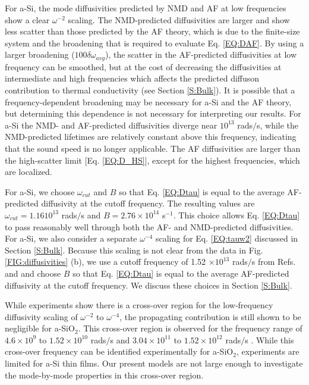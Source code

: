 \documentclass[aps,prb,twocolumn,superscriptaddress,footinbib,amsmath,amssymb,floatfix]{revtex4}
\begin{document}
For a-Si, the mode diffusivities predicted by NMD and AF at 
low frequencies show a clear $\omega^{-2}$ scaling. 
The NMD-predicted diffusivities are larger and show less 
scatter than those predicted by the AF theory, which is due to 
the finite-size system and the broadening that is 
required to evaluate 
Eq. \eqref{EQ:DAF}.\cite{feldman_thermal_1993} By using a larger 
broadening ($100\delta\omega_{avg}$), the scatter 
in the AF-predicted 
diffusivities at low frequency can be smoothed, but at the cost of 
decreasing the diffusivities at intermediate and 
high frequencies which 
affects the predicted diffuson contribution to thermal conductivity 
(see Section \ref{S:Bulk}). 
It is possible that a frequency-dependent broadening may be necessary 
for a-Si and the AF theory,  
but determining this dependence is not necessary for 
interpreting our results. 
For a-Si the NMD- and AF-predicted diffusivities diverge 
near $10^{13}$ rads$/$s, while the NMD-predicted lifetimes 
are relatively constant above this frequency, 
indicating that the sound speed is no longer 
applicable. The AF diffusivities are 
larger than the high-scatter limit [Eq. \eqref{EQ:D_HS}], 
except for the 
highest frequencies, which are localized.\cite{feldman_thermal_1993} 

For a-Si, we choose $\omega_{cut}$  
and $B$ so that Eq. \eqref{EQ:Dtau} is equal 
to the average AF-predicted diffusivity at the cutoff frequency. 
The resulting values are $\omega_{cut}=1.16 10^{13}$ rads$/$s 
and $B=2.76\times10^{14}$ s$^{-1}$. This choice 
allows Eq. \eqref{EQ:Dtau} to pass reasonably well through both 
the AF- and NMD-predicted diffusivities. For a-Si, we also 
consider a separate $\omega^{-4}$ scaling 
for Eq. \eqref{EQ:tauw2} discussed in Section \ref{S:Bulk}. 
Because this scaling is not clear from the data in 
Fig. \ref{FIG:diffusivities} (b),  
we use a cutoff frequency of 1.52 $\times 10^{13}$ rads$/$s  
from Refs.  and 
and choose $B$ so that Eq. \eqref{EQ:Dtau} is equal to the average 
AF-predicted diffusivity at the cutoff frequency. 
We discuss these choices in Section \ref{S:Bulk}. 

While experiments show there is a cross-over region for the 
low-frequency diffusivity scaling of $\omega^{-2}$ to 
$\omega^{-4}$,
\cite{masciovecchio_evidence_2006,baldi_emergence_2013} 
the propagating contribution is still shown to be negligible 
for a-SiO$_2$.
\cite{love_estimate_1990,baldi_thermal_2008}
This cross-over region is observed for the frequency range of 
$4.6\times10^9$ to 
$1.52\times10^{10}$ rads$/$s\cite{masciovecchio_evidence_2006} 
and $3.04\times10^11$ to $1.52\times10^{12}$ rads$/$s
\cite{baldi_emergence_2013}. While this cross-over frequency 
can be identified 
experimentally for a-SiO$_2$,\cite{masciovecchio_evidence_2006} 
experiments are limited for a-Si thin films.
\cite{hondongwa_ultrasonic_2011} 
Our present models are not 
large enough to investigate the mode-by-mode properties 
in this cross-over region.
\end{document}
